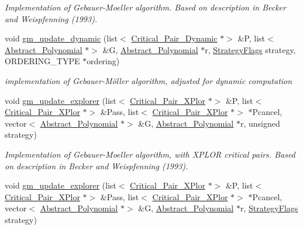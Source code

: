 \begin{DoxyCompactItemize}
\begin{DoxyCompactList}\small\item\em Implementation of Gebauer-\/\+Moeller algorithm. Based on description in Becker and Weispfenning (1993). \end{DoxyCompactList}\item 
void \hyperlink{group___g_b_computation_gad32cd8611436b39a9a00338c33199e76}{gm\+\_\+update\+\_\+dynamic} (list$<$ \hyperlink{group___g_b_computation_class_critical___pair___dynamic}{Critical\+\_\+\+Pair\+\_\+\+Dynamic} $\ast$$>$ \&P, list$<$ \hyperlink{group__polygroup_class_abstract___polynomial}{Abstract\+\_\+\+Polynomial} $\ast$$>$ \&G, \hyperlink{group__polygroup_class_abstract___polynomial}{Abstract\+\_\+\+Polynomial} $\ast$r, \hyperlink{group__strategygroup_ga0ee6c8e033547330e6b89929730007f4}{Strategy\+Flags} strategy, O\+R\+D\+E\+R\+I\+N\+G\+\_\+\+T\+Y\+PE $\ast$ordering)
\begin{DoxyCompactList}\small\item\em implementation of Gebauer-\/M\"{o}ller algorithm, adjusted for dynamic computation \end{DoxyCompactList}\item 
void \hyperlink{group___g_b_computation_gabea57aedc3f652eba7890574dda52f08}{gm\+\_\+update\+\_\+explorer} (list$<$ \hyperlink{group___g_b_computation_class_critical___pair___x_plor}{Critical\+\_\+\+Pair\+\_\+\+X\+Plor} $\ast$$>$ \&P, list$<$ \hyperlink{group___g_b_computation_class_critical___pair___x_plor}{Critical\+\_\+\+Pair\+\_\+\+X\+Plor} $\ast$$>$ \&Pass, list$<$ \hyperlink{group___g_b_computation_class_critical___pair___x_plor}{Critical\+\_\+\+Pair\+\_\+\+X\+Plor} $\ast$$>$ $\ast$Pcancel, vector$<$ \hyperlink{group__polygroup_class_abstract___polynomial}{Abstract\+\_\+\+Polynomial} $\ast$$>$ \&G, \hyperlink{group__polygroup_class_abstract___polynomial}{Abstract\+\_\+\+Polynomial} $\ast$r, unsigned strategy)
\begin{DoxyCompactList}\small\item\em Implementation of Gebauer-\/\+Moeller algorithm, with X\+P\+L\+OR critical pairs. Based on description in Becker and Weispfenning (1993). \end{DoxyCompactList}\item 
void \hyperlink{group___g_b_computation_gab3006092b36dd11b4f06053e8dab6f19}{gm\+\_\+update\+\_\+explorer} (list$<$ \hyperlink{group___g_b_computation_class_critical___pair___x_plor}{Critical\+\_\+\+Pair\+\_\+\+X\+Plor} $\ast$$>$ \&P, list$<$ \hyperlink{group___g_b_computation_class_critical___pair___x_plor}{Critical\+\_\+\+Pair\+\_\+\+X\+Plor} $\ast$$>$ \&Pass, list$<$ \hyperlink{group___g_b_computation_class_critical___pair___x_plor}{Critical\+\_\+\+Pair\+\_\+\+X\+Plor} $\ast$$>$ $\ast$Pcancel, vector$<$ \hyperlink{group__polygroup_class_abstract___polynomial}{Abstract\+\_\+\+Polynomial} $\ast$$>$ \&G, \hyperlink{group__polygroup_class_abstract___polynomial}{Abstract\+\_\+\+Polynomial} $\ast$r, \hyperlink{group__strategygroup_ga0ee6c8e033547330e6b89929730007f4}{Strategy\+Flags} strategy)

\end{DoxyCompactItemize}
